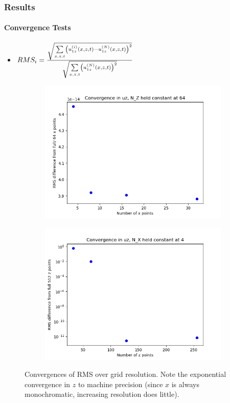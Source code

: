 \documentclass[dvipsnames]{beamer}
\DeclarePairedDelimiter\p{\lparen}{\rparen}
\begin{document}
\begin{frame}
    \frametitle{Results}
    \framesubtitle{Convergence Tests}

    \begin{itemize}
        \item $RMS_i = \frac{\sqrt{\sum\limits_{x, z, t} \p*{u_{1z}^{(i)}(x, z,
            t) - u_{1z}^{(N)}(x, z, t)}^2}}{\sqrt{ \sum\limits_{x, z, t}
            \p*{u_{1z}^{(N)}(x, z, t)}^2}}$
    \end{itemize}
    \begin{figure}[!h]
        \centering
        \begin{subfigure}{0.37\textwidth}
            \centering
            \includegraphics[width=\textwidth]{../sims/2d_strat_conv/x_conv.png}
        \end{subfigure}
        \begin{subfigure}{0.37\textwidth}
            \centering
            \includegraphics[width=\textwidth]{../sims/2d_strat_conv/z_conv.png}
        \end{subfigure}
        \caption{Convergences of RMS over grid resolution. Note the exponential
        convergence in $z$ to machine precision (since $x$ is always
        monochromatic, increasing resolution does little).}\label{fig:convsv}
    \end{figure}
\end{frame}
\end{document}
